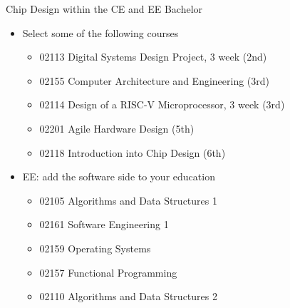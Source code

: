 \begin{frame}[fragile]{Chip Design within the CE and EE Bachelor}
\begin{itemize}
\item Select some of the following courses
\begin{itemize}
\item 02113 Digital Systems Design Project, 3 week (2nd)
\item 02155 Computer Architecture and Engineering (3rd)
\item 02114 Design of a RISC-V Microprocessor, 3 week (3rd)
\item 02201 Agile Hardware Design (5th)
\item 02118 Introduction into Chip Design (6th)
\end{itemize}
\item EE: add the software side to your education
\begin{itemize}
\item 02105 Algorithms and Data Structures 1
\item 02161 Software Engineering 1
\item 02159 Operating Systems
\item 02157 Functional Programming
\item 02110 Algorithms and Data Structures 2
\end{itemize}
\end{itemize}
\end{frame}

